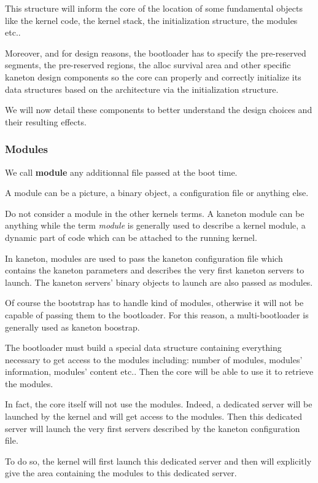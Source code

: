 This structure will inform the core of the location of some
fundamental objects like the kernel code, the kernel stack, the
initialization structure, the modules etc..

Moreover, and for design reasons, the bootloader has to specify the
pre-reserved segments, the pre-reserved regions, the alloc survival area
and other specific kaneton design components so the core can properly
and correctly initialize its data structures based on the architecture
via the initialization structure.

We will now detail these components to better understand the design
choices and their resulting effects.

%
%

\subsubsection{Modules}

We call \textbf{module} any additionnal file passed at the boot time.

A module can be a picture, a binary object, a configuration file
or anything else.

Do not consider a module in the other kernels terms. A kaneton module
can be anything while the term \textit{module} is generally used to describe
a kernel module, a dynamic part of code which can be attached to the
running kernel.

In kaneton, modules are used to pass the kaneton configuration file
which contains the kaneton parameters and describes the very first
kaneton servers to launch. The kaneton servers' binary objects to
launch are also passed as modules.

Of course the bootstrap has to handle kind of modules, otherwise it will
not be capable of passing them to the bootloader. For this reason,
a multi-bootloader is generally used as kaneton boostrap.

The bootloader must build a special data structure containing everything
necessary to get access to the modules including: number of modules,
modules' information, modules' content etc.. Then the core will be
able to use it to retrieve the modules.

In fact, the core itself will not use the modules. Indeed, a dedicated
server will be launched by the kernel and will get access to the modules.
Then this dedicated server will launch the very first servers described
by the kaneton configuration file.

To do so, the kernel will first launch this dedicated server and then
will explicitly give the area containing the modules to this dedicated
server.


